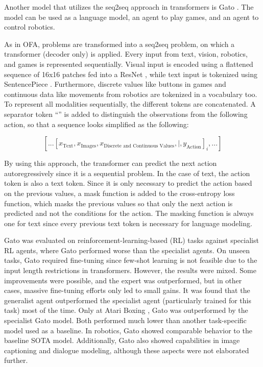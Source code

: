 \documentclass[
]{krantz}
\begin{document}
Another model that utilizes the seq2seq approach in transformers is Gato \citep{Reed2022}. The model can be used as a language model, an agent to play games, and an agent to control robotics.

As in OFA, problems are transformed into a seq2seq problem, on which a transformer (decoder only) is applied. Every input from text, vision, robotics, and games is represented sequentially.
Visual input is encoded using a flattened sequence of 16x16 patches fed into a ResNet \citep{ResNet}, while text input is tokenized using SentencePiece \citep{kudo-richardson-2018-sentencepiece}.
Furthermore, discrete values like buttons in games and continuous data like movements from robotics are tokenized in a vocabulary too. To represent
all modalities sequentially, the different tokens are concatenated. A separator token ``\textbar{}'' is added to distinguish the observations from the following action, so that a sequence looks simplified as the following:

\[\left [ ... \left [ x_{\textrm{Text}}, x_{\textrm{Images}}, x_{\textrm{Discrete and Continuous Values}}, |, y_{\textrm{Action}} \right ]_i, ... \right ]\]

By using this approach, the transformer can predict the next action autoregressively since it is a sequential problem. In the case of text, the action token is also a text token. Since it is
only necessary to predict the action based on the previous values, a mask function is added to the cross-entropy loss function, which masks the previous values so that only the next action
is predicted and not the conditions for the action. The masking function is always one for text since every previous text token is necessary for language modeling.

Gato was evaluated on reinforcement-learning-based (RL) tasks against specialist RL agents, where Gato performed worse than the specialist agents. On unseen tasks, Gato required fine-tuning since
few-shot learning is not feasible due to the input length restrictions in transformers. However, the results were mixed. Some improvements were possible, and the expert was outperformed, but
in other cases, massive fine-tuning efforts only led to small gains. It was found that the generalist agent outperformed the specialist agent (particularly trained for this task) most of the time.
Only at Atari Boxing \citep{atari}, Gato was outperformed by the specialist Gato model. Both performed much lower than another task-specific model used as a baseline. In robotics, Gato showed comparable
behavior to the baseline SOTA model. Additionally, Gato also showed capabilities in image captioning and dialogue modeling, although these aspects were not elaborated further.
\end{document}
